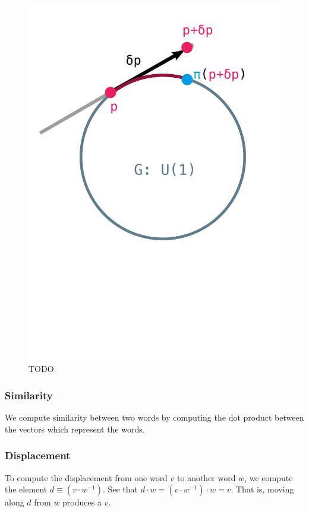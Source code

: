 \documentclass[11pt]{book}
\begin{document}
\begin{figure}[htb]
\includegraphics{./gradient-manifold.pdf}
\caption{TODO}
\end{figure}

\subsubsection{Similarity} We compute similarity between two words by computing the dot product between
the vectors which represent the words.

\subsubsection{Displacement} To compute the displacement from one word $v$ to another word $w$, we compute the element $d \equiv (v \cdot w^{-1})$.
See that $d \cdot w = (v \cdot w^{-1}) \cdot w = v$. That is, moving along $d$ from $w$ produces a $v$.
\end{document}
